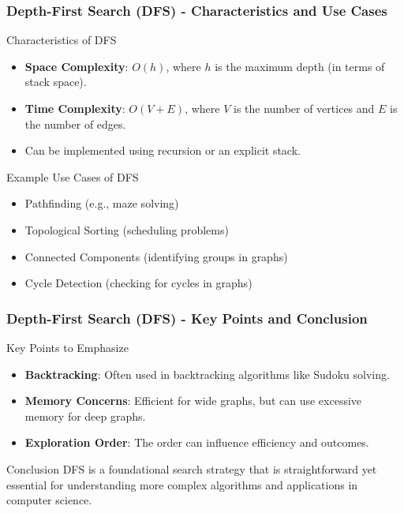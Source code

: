 \documentclass[aspectratio=169]{beamer}
\begin{document}
\begin{frame}[fragile]
    \frametitle{Depth-First Search (DFS) - Characteristics and Use Cases}
    \begin{block}{Characteristics of DFS}
        \begin{itemize}
            \item \textbf{Space Complexity}: $O(h)$, where $h$ is the maximum depth (in terms of stack space).
            \item \textbf{Time Complexity}: $O(V + E)$, where $V$ is the number of vertices and $E$ is the number of edges.
            \item Can be implemented using recursion or an explicit stack.
        \end{itemize}
    \end{block}
    
    \begin{block}{Example Use Cases of DFS}
        \begin{itemize}
            \item Pathfinding (e.g., maze solving)
            \item Topological Sorting (scheduling problems)
            \item Connected Components (identifying groups in graphs)
            \item Cycle Detection (checking for cycles in graphs)
        \end{itemize}
    \end{block}
\end{frame}

\begin{frame}[fragile]
    \frametitle{Depth-First Search (DFS) - Key Points and Conclusion}
    \begin{block}{Key Points to Emphasize}
        \begin{itemize}
            \item \textbf{Backtracking}: Often used in backtracking algorithms like Sudoku solving.
            \item \textbf{Memory Concerns}: Efficient for wide graphs, but can use excessive memory for deep graphs.
            \item \textbf{Exploration Order}: The order can influence efficiency and outcomes.
        \end{itemize}
    \end{block}
    
    \begin{block}{Conclusion}
        DFS is a foundational search strategy that is straightforward yet essential for understanding more complex algorithms and applications in computer science.
    \end{block}
\end{frame}
\end{document}
